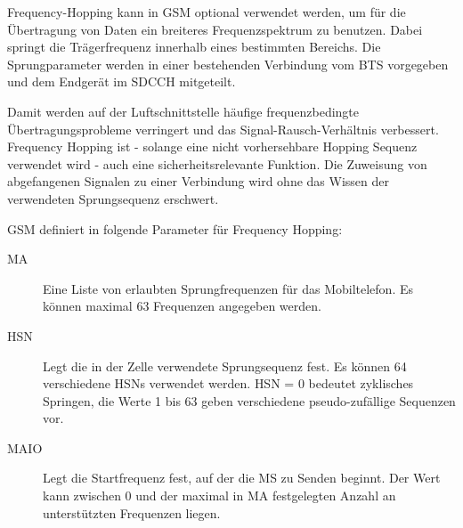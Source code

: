 Frequency-Hopping kann in \ac{GSM} optional verwendet werden, um für die Übertragung von Daten ein breiteres Frequenzspektrum zu benutzen. Dabei springt die Trägerfrequenz innerhalb eines bestimmten Bereichs. Die Sprungparameter werden in einer bestehenden Verbindung vom \ac{BTS} vorgegeben und dem Endgerät im \ac{SDCCH} mitgeteilt.

Damit werden auf der Luftschnittstelle häufige frequenzbedingte Übertragungsprobleme verringert und das Signal-Rausch-Verhältnis verbessert. Frequency Hopping ist - solange eine nicht vorhersehbare Hopping Sequenz verwendet wird - auch eine sicherheitsrelevante Funktion. Die Zuweisung von abgefangenen Signalen zu einer Verbindung wird ohne das Wissen der verwendeten Sprungsequenz erschwert.

\ac{GSM} definiert in  folgende Parameter für Frequency Hopping:
\begin{description}
\item[\acf{MA}] Eine Liste von erlaubten Sprungfrequenzen für das Mobiltelefon. Es können maximal 63 Frequenzen angegeben werden.
\item[\acf{HSN}] Legt die in der Zelle verwendete Sprungsequenz fest. Es können 64 verschiedene \acp{HSN} verwendet werden. \ac{HSN} = 0 bedeutet zyklisches Springen, die Werte 1 bis 63 geben verschiedene pseudo-zufällige Sequenzen vor.
\item[\acf{MAIO}] Legt die Startfrequenz fest, auf der die \ac{MS} zu Senden beginnt. Der Wert kann zwischen 0 und der maximal in \ac{MA} festgelegten Anzahl an unterstützten Frequenzen liegen.
\end{description}